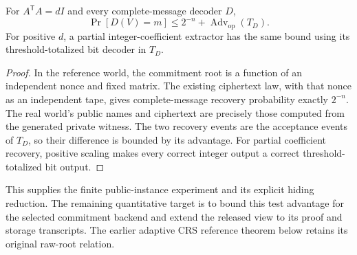 \begin{theorem}
For \(A^{\mathsf T}A=dI\) and every complete-message decoder \(D\),
\[
 \Pr[D(V)=m]\leq 2^{-n}+\operatorname{Adv}_{\mathrm{op}}(T_D).
\]
For positive \(d\), a partial integer-coefficient extractor has the same
bound using its threshold-totalized bit decoder in \(T_D\).
\end{theorem}

\begin{proof}
In the reference world, the commitment root is a function of an independent
nonce and fixed matrix. The existing ciphertext law, with that nonce as an
independent tape, gives complete-message recovery probability exactly
\(2^{-n}\). The real world's public names and ciphertext are precisely those
computed from the generated private witness. The two recovery events are
the acceptance events of \(T_D\), so their difference is bounded by its
advantage. For partial coefficient recovery, positive scaling makes every
correct integer output a correct threshold-totalized bit output.
\end{proof}

This supplies the finite public-instance experiment and its explicit hiding
reduction. The remaining quantitative target is to bound this test advantage
for the selected commitment backend and extend the released view to its
proof and storage transcripts. The earlier adaptive CRS reference theorem
below retains its original raw-root relation.
